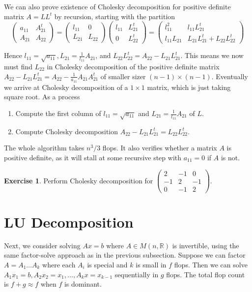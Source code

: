 \documentclass[12pt]{amsart}
\theoremstyle{definition}
\newtheorem{exercise}[theorem]{Exercise}
\begin{document}
We can also prove existence of Cholesky decomposition for positive definite matrix $A = LL^t$ by recursion, starting with the partition
$$\left(\begin{array}{cc} a_{11} & A^t_{21} \\ A_{21} & A_{22} \end{array}\right) = \left(\begin{array}{cc} l_{11} & 0 \\ L_{21} & L_{22} \end{array}\right) \left(\begin{array}{cc} l_{11} & L^t_{21} \\ 0 & L^t_{22} \end{array}\right) = \left(\begin{array}{cc} l^2_{11} & l_{11}L^t_{21} \\ l_{11}L_{21} & L_{21}L^t_{21} + L_{22}L^t_{22} \end{array}\right)$$

Hence $l_{11} = \sqrt{a_{11}}, L_{21} = \frac{1}{l_{11}}A_{21}$, and $L_{22}L^t_{22} = A_{22} - L_{21}L^t_{21}$. This means we now must find $L_{22}$ in Cholesky decomposition of the positive definite matrix $A_{22} - L_{21}L^t_{21} = A_{22} - \frac{1}{a_{11}}A_{21}A^t_{21}$ of smaller sizer $(n-1) \times (n-1)$. Eventually we arrive at Cholesky decomposition of a $1 \times 1$ matrix, which is just taking square root. As a process
\begin{enumerate}[\indent 1.]
\item Compute the first column of $l_{11} = \sqrt{a_{11}}$ and $L_{21} = \frac{1}{l_{11}}A_{21}$ of $L$.
\item Compute Cholesky decomposition $A_{22} - L_{21}L_{21}^t = L_{22}L_{22}^t$.
\end{enumerate}

The whole algorithm takes $n^3/3$ flops. It also verifies whether a matrix $A$ is positive definite, as it will stall at some recursive step with $a_{11} = 0$ if $A$ is not.

\begin{exercise}\label{} Perform Cholesky decomposition for $\left(\begin{array}{ccc} 2 & -1 & 0 \\ -1 & 2 & -1 \\ 0 & -1 & 2 \end{array}\right)$.
\end{exercise}

\section{LU Decomposition} Next, we consider solving $Ax = b$ where $A \in M(n, \mathbb{R})$ is invertible, using the same factor-solve approach as in the previous subsection. Suppose we can factor $A = A_1 \dots A_k$ where each $A_i$ is special and $k$ is small in $f$ flops. Then we can solve $A_1x_1 = b, A_2x_2 = x_1, \dots , A_kx = x_{k-1}$ sequentially in $g$ flops. The total flop count is $f+g \approx f$ when $f$ is dominant.
\end{document}
